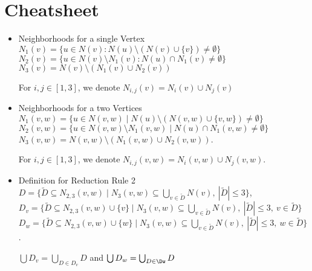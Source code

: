 \documentclass[12p,a5paper, paper=portrait]{article}
\begin{document}
\section*{Cheatsheet}


    \begin{itemize}
    \item Neighborhoods for a single Vertex \\

    $ N_1(v) = \{u \in N(v) : N(u) \setminus (N(v)\cup \{v\}) \neq \emptyset \} $\\
    $ N_2(v) = \{u \in N(v)\setminus N_1(v) : N(u) \cap N_1(v) \neq \emptyset \} $\\
    $ N_3(v) = N(v) \setminus (N_1(v) \cup N_2(v))$

    For $i,j \in [1,3]$, we denote $N_{i,j} (v) = N_i(v) \cup N_j(v)$ 

    \item Neighborhoods for a two Vertices\\
    
    $ N_1(v,w) = \{u \in N(v,w) \mid N(u) \setminus (N(v,w)\cup \{v,w\}) \neq \emptyset \} $\\
    $ N_2(v,w) = \{u \in N(v,w)\setminus N_1(v,w) \mid N(u) \cap N_1(v,w) \neq \emptyset \}$\\
    $ N_3(v,w) =  N(v,w) \setminus (N_1(v,w) \cup N_2(v,w))$.

    For $i,j \in [1,3]$, we denote $N_{i,j}(v,w) = N_i(v,w) \cup N_j(v,w)$.


    \item Definition for Reduction Rule 2\\
   
        $D = \{ \tilde D \subseteq N_{2,3}(v,w)            \mid N_3(v,w) \subseteq \bigcup_{v \in \tilde D} N(v),\ |\tilde D| \leq 3                  \}$,\\
        $D_v = \{ \tilde D \subseteq N_{2,3}(v,w) \cup \{v\} \mid N_3(v,w) \subseteq \bigcup_{v \in \tilde D} N(v),\ |\tilde D| \leq 3,\ v \in \tilde D \}$ \\
        $D_w = \{ \tilde D \subseteq N_{2,3}(v,w) \cup \{w\} \mid N_3(v,w) \subseteq \bigcup_{v \in \tilde D} N(v),\ |\tilde D| \leq 3,\ w \in \tilde D \}$.

        $\bigcup D_v = \bigcup_{D \in D_v} D$ and $\bigcup D_w = \bigcup_{D \in \Dw} D$
    \end{itemize}
\end{document}
